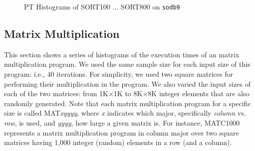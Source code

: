 \documentclass[10pt]{article}
\begin{document}
\begin{figure}[htp!]
{		\label{fig:s9_sort400_dist}
	}
	\caption{PT Histograms of SORT100 ... SORT800 on {\tt sodb9}~\label{fig:new_s9_sort1}}
\end{figure}

\clearpage
\pagebreak

\subsection{Matrix Multiplication~\label{sec:mm}} 

This section shows a series of histograms of 
the execution times of an matrix multiplication program. 
We used the same sample size for each input size of this program: i.e., 40 iterations. 
For simplicity, we used two square matrices for performing their multiplication in the program.  
We also varied the input sizes of each of the two matrices: 
from 1K$\times$1K to 8K$\times$8K integer elements that are also randomly generated. 
Note that each matrix multiplication program for a specific size is called MAT{\it xyyyy}, 
where {\it x} indicates which major, specifically {\em column} vs. {\em row}, is used, and {\it yyyy}, how large a given matrix is. 
For instance, MATC1000 represents a matrix multiplication program 
in column major over two square matrices having 1,000 integer (random) 
elements in a row (and a column). 
\end{document}
